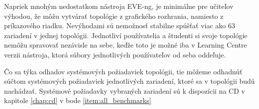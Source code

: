 Napriek mnohým nedostatkom nástroja EVE-ng, je minimálne pre učiteľov výhodou, že môžu vytvárať topológie z grafického rozhrania, namiesto z príkazového riadku. Nevýhodami sú nemožnosť stabilne spúšťať viac ako 63 zariadení v jednej topológii. Jednotliví používatelia a študenti si svoje topológie nemôžu spravovať nezávisle na sebe, keďže toto je možné iba v Learning Centre verzii nástroja, ktorá súbory jednotlivých používateľov od seba oddeľuje.

Čo sa týka odhadov systémových požiadaviek topológii, tie môžeme odhadnúť súčtom systémových požiadaviek jednotlivých zariadení, ktoré sa v topológii budú nachádzať. Systémové požiadavky vybraných zariadení sú k dispozícii na CD v kapitole \ref{chap:cd} v bode \ref{item:all_benchmarks}